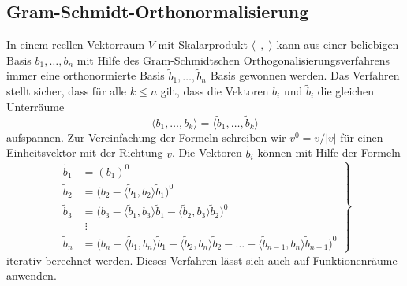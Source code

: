 \subsection{Gram-Schmidt-Orthonormalisierung}
%
In einem reellen Vektorraum $V$ mit Skalarprodukt $\langle\;\,,\;\rangle$
kann aus einer beliebigen Basis $b_1,\dots,b_n$ mit Hilfe des 
Gram-Schmidtschen Orthogonalisierungsverfahrens immer eine
orthonormierte Basis $\tilde{b}_1,\dots,\tilde{b}_n$ Basis
gewonnen werden.
Das Verfahren stellt sicher, dass für alle $k\le n$ gilt,
dass die Vektoren $b_i$ und $\tilde{b}_i$ die gleichen Unterräume
\[
\langle b_1,\dots,b_k\rangle
=
\langle \tilde{b}_1,\dots,\tilde{b}_k\rangle
\]
aufspannen.
Zur Vereinfachung der Formeln schreiben wir $v^0=v/|v|$ für einen
Einheitsvektor mit der Richtung $v$.
Die Vektoren $\tilde{b}_i$ können mit Hilfe der Formeln
\begin{equation}
\left.
\begin{aligned}
\tilde{b}_1
&=
(b_1)^0
\\
\tilde{b}_2
&=
\bigl(
b_2
-
\langle \tilde{b}_1,b_2\rangle \tilde{b}_1
\bigr)^0
\\
\tilde{b}_3
&=
\bigl(
b_3
-
\langle \tilde{b}_1,b_3\rangle \tilde{b}_1
-
\langle \tilde{b}_2,b_3\rangle \tilde{b}_2
\bigr)^0
\\
&\;\vdots
\\
\tilde{b}_n
&=
\bigl(
b_n
-
\langle \tilde{b}_1,b_n\rangle \tilde{b}_1
-
\langle \tilde{b}_2,b_n\rangle \tilde{b}_2
-\dots
-
\langle \tilde{b}_{n-1},b_n\rangle \tilde{b}_{n-1}
\bigr)^0
\end{aligned}
\right\}
\label{buch:orthogonal:eqn:orthonormalisierung}
\end{equation}
iterativ berechnet werden.
Dieses Verfahren lässt sich auch auf Funktionenräume anwenden.

